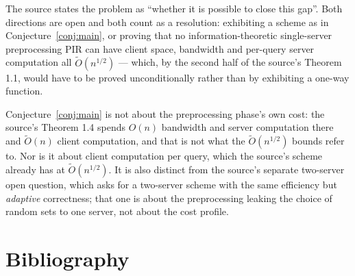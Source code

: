 \documentclass{aicr-conjecture}
\newcommand{\Ot}{\widetilde{O}}
\begin{document}
\begin{remark}
The source states the problem as ``whether it is possible to close this
gap''. Both directions are open and both count as a resolution:
exhibiting a scheme as in Conjecture~\ref{conj:main}, or proving that no
information-theoretic single-server preprocessing PIR can have client
space, bandwidth and per-query server computation all $\Ot(n^{1/2})$ ---
which, by the second half of the source's Theorem 1.1, would have to be
proved unconditionally rather than by exhibiting a one-way function.
\end{remark}

\begin{remark}
Conjecture~\ref{conj:main} is not about the preprocessing phase's own
cost: the source's Theorem 1.4 spends $O(n)$ bandwidth and server
computation there and $\Ot(n)$ client computation, and that is not what
the $\Ot(n^{1/2})$ bounds refer to. Nor is it about client computation
per query, which the source's scheme already has at $\Ot(n^{1/2})$. It
is also distinct from the source's separate two-server open question,
which asks for a two-server scheme with the same efficiency but
\emph{adaptive} correctness; that one is about the preprocessing leaking
the choice of random sets to one server, not about the cost profile.
\end{remark}

\section{Bibliography}
\end{document}
